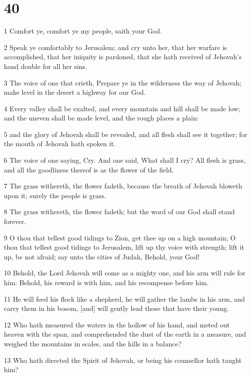 \chapter{40}

\par 1 Comfort ye, comfort ye my people, saith your God.
\par 2 Speak ye comfortably to Jerusalem; and cry unto her, that her warfare is accomplished, that her iniquity is pardoned, that she hath received of Jehovah's hand double for all her sins.
\par 3 The voice of one that crieth, Prepare ye in the wilderness the way of Jehovah; make level in the desert a highway for our God.
\par 4 Every valley shall be exalted, and every mountain and hill shall be made low; and the uneven shall be made level, and the rough places a plain:
\par 5 and the glory of Jehovah shall be revealed, and all flesh shall see it together; for the mouth of Jehovah hath spoken it.
\par 6 The voice of one saying, Cry. And one said, What shall I cry? All flesh is grass, and all the goodliness thereof is as the flower of the field.
\par 7 The grass withereth, the flower fadeth, because the breath of Jehovah bloweth upon it; surely the people is grass.
\par 8 The grass withereth, the flower fadeth; but the word of our God shall stand forever.
\par 9 O thou that tellest good tidings to Zion, get thee up on a high mountain; O thou that tellest good tidings to Jerusalem, lift up thy voice with strength; lift it up, be not afraid; say unto the cities of Judah, Behold, your God!
\par 10 Behold, the Lord Jehovah will come as a mighty one, and his arm will rule for him: Behold, his reward is with him, and his recompense before him.
\par 11 He will feed his flock like a shepherd, he will gather the lambs in his arm, and carry them in his bosom, [and] will gently lead those that have their young.
\par 12 Who hath measured the waters in the hollow of his hand, and meted out heaven with the span, and comprehended the dust of the earth in a measure, and weighed the mountains in scales, and the hills in a balance?
\par 13 Who hath directed the Spirit of Jehovah, or being his counsellor hath taught him?
